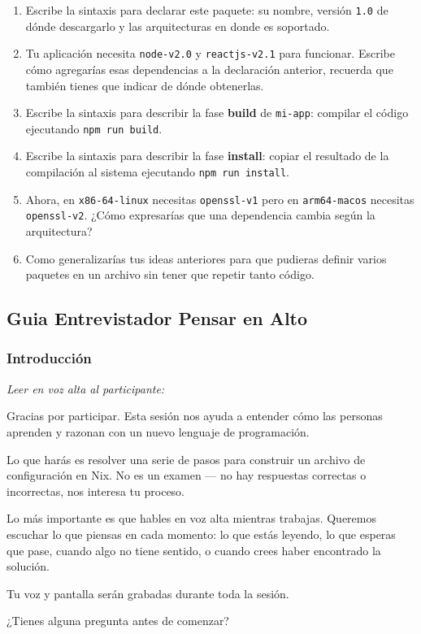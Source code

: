 \begin{enumerate}
\item Escribe la sintaxis para declarar este paquete: su nombre, versión \texttt{1.0} de dónde descargarlo y las arquitecturas en donde es soportado.
\item Tu aplicación necesita \texttt{node-v2.0} y \texttt{reactjs-v2.1} para funcionar. Escribe cómo agregarías esas dependencias a la declaración anterior, recuerda que también tienes que indicar de dónde obtenerlas.
\item Escribe la sintaxis para describir la fase \textbf{build} de \texttt{mi-app}: compilar el código ejecutando \texttt{npm run build}.
\item Escribe la sintaxis para describir la fase \textbf{install}: copiar el resultado de la compilación al sistema ejecutando \texttt{npm run install}.
\item Ahora, en \texttt{x86-64-linux} necesitas \texttt{openssl-v1} pero en \texttt{arm64-macos} necesitas \texttt{openssl-v2}. ¿Cómo expresarías que una dependencia cambia según la arquitectura?
\item Como generalizarías tus ideas anteriores para que pudieras definir varios paquetes en un archivo sin tener que repetir tanto código.
\end{enumerate}

\subsection{Guia Entrevistador Pensar en Alto}

\subsubsection{Introducción}

\emph{Leer en voz alta al participante:}

\begin{cajagris}
Gracias por participar. Esta sesión nos ayuda a entender cómo las personas aprenden y razonan con un nuevo lenguaje de programación.

Lo que harás es resolver una serie de pasos para construir un archivo de configuración en Nix. No es un examen --- no hay respuestas correctas o incorrectas, nos interesa tu proceso.

Lo más importante es que hables en voz alta mientras trabajas. Queremos escuchar lo que piensas en cada momento: lo que estás leyendo, lo que esperas que pase, cuando algo no tiene sentido, o cuando crees haber encontrado la solución.

Tu voz y pantalla serán grabadas durante toda la sesión.

¿Tienes alguna pregunta antes de comenzar?
\end{cajagris}

